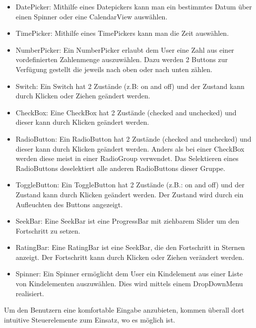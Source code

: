 \documentclass[FIPLY_base.tex]{subfiles}
\begin{document}
\begin{itemize}
	\item DatePicker: Mithilfe eines Datepickers kann man ein bestimmtes Datum über einen Spinner oder eine CalendarView auswählen.
	\item TimePicker: Mithilfe eines TimePickers kann man die Zeit auswählen.
	\item NumberPicker: Ein NumberPicker erlaubt dem User eine Zahl aus einer vordefinierten Zahlenmenge auszuwählen. Dazu werden 2 Buttons zur Verfügung gestellt die jeweils nach oben oder nach unten zählen.
	\item Switch: Ein Switch hat 2 Zustände (z.B: on and off) und der Zustand kann durch Klicken oder Ziehen geändert werden.
	\item CheckBox: Eine CheckBox hat 2 Zustände (checked and unchecked) und dieser kann durch Klicken geändert werden.
	\item RadioButton: Ein RadioButton hat 2 Zustände (checked and unchecked) und 
	dieser kann durch Klicken geändert werden. Anders als bei einer CheckBox werden diese meist in einer RadioGroup verwendet.
	Das Selektieren eines RadioButtons deselektiert alle anderen RadioButtons dieser Gruppe.
	\item ToggleButton: Ein ToggleButton hat 2 Zustände (z.B.: on and off) und der Zustand kann durch Klicken geändert werden. Der Zustand wird durch ein Aufleuchten des Buttons angezeigt.
	\item SeekBar: Eine SeekBar ist eine ProgressBar mit ziehbarem Slider um den Fortschritt zu setzen.
	\item RatingBar: Eine RatingBar ist eine SeekBar, die den Fortschritt in Sternen anzeigt. Der Fortschritt kann durch Klicken oder Ziehen verändert 
	werden.
	\item Spinner: Ein Spinner ermöglicht dem User ein Kindelement aus einer Liste von Kindelementen auszuwählen. Dies wird mittels einem 
	DropDownMenu realisiert.	
\end{itemize}
Um den Benutzern eine komfortable Eingabe anzubieten, kommen überall dort intuitive Steuerelemente zum Einsatz, wo es möglich ist.
\end{document}
